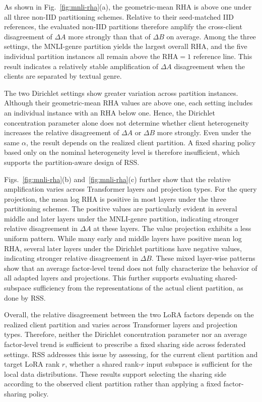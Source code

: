 \documentclass[lettersize,journal]{IEEEtran}
\begin{document}
{			As shown in Fig.~\ref{fig:mnli-rha}(a), the geometric-mean RHA is above one under all three non-IID partitioning schemes. Relative to their seed-matched IID references, the evaluated non-IID partitions therefore amplify the cross-client disagreement of $\Delta A$ more strongly than that of $\Delta B$ on average. Among the three settings, the MNLI-genre partition yields the largest overall RHA, and the five individual partition instances all remain above the $\mathrm{RHA}=1$ reference line. This result indicates a relatively stable amplification of $\Delta A$ disagreement when the clients are separated by textual genre.
			
			The two Dirichlet settings show greater variation across partition instances. Although their geometric-mean RHA values are above one, each setting includes an individual instance with an RHA below one. Hence, the Dirichlet concentration parameter alone does not determine whether client heterogeneity increases the relative disagreement of $\Delta A$ or $\Delta B$ more strongly. Even under the same $\alpha$, the result depends on the realized client partition. A fixed sharing policy based only on the nominal heterogeneity level is therefore insufficient, which supports the partition-aware design of RSS.
			
			Figs.~\ref{fig:mnli-rha}(b) and~\ref{fig:mnli-rha}(c) further show that the relative amplification varies across Transformer layers and projection types. For the query projection, the mean log RHA is positive in most layers under the three partitioning schemes. The positive values are particularly evident in several middle and later layers under the MNLI-genre partition, indicating stronger relative disagreement in $\Delta A$ at these layers. The value projection exhibits a less uniform pattern. While many early and middle layers have positive mean log RHA, several later layers under the Dirichlet partitions have negative values, indicating stronger relative disagreement in $\Delta B$. These mixed layer-wise patterns show that an average factor-level trend does not fully characterize the behavior of all adapted layers and projections. This further supports evaluating shared-subspace sufficiency from the representations of the actual client partition, as done by RSS.
			
			Overall, the relative disagreement between the two LoRA factors depends on the realized client partition and varies across Transformer layers and projection types. Therefore, neither the Dirichlet concentration parameter nor an average factor-level trend is sufficient to prescribe a fixed sharing side across federated settings. RSS addresses this issue by assessing, for the current client partition and target LoRA rank $r$, whether a shared rank-$r$ input subspace is sufficient for the local data distributions. These results support selecting the sharing side according to the observed client partition rather than applying a fixed factor-sharing policy.}
\end{document}
